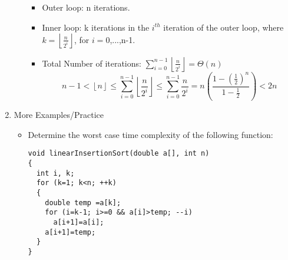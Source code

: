 \begin{enumerate}
\begin{itemize}
    \begin{itemize}
    \item Outer loop: n iterations.
    \item Inner loop: k iterations in the $i^{th}$ iteration of the outer loop, where $k=\left\lfloor\frac{n}{2^{i}}\right\rfloor$, for $i=0$,...,n-1.
    \item Total Number of iterations: $\displaystyle \sum\limits_{i=0}^{n-1}\left\lfloor\frac{n}{2^{i}}\right\rfloor =\Theta (n)$
    $$n-1 < \left\lfloor n\right\rfloor \leq \sum\limits_{i=0}^{n-1}\left\lfloor\frac{n}{2^{i}}\right\rfloor \leq \sum\limits_{i=0}^{n-1}\frac{n}{2^{i}} = n\left(\frac{1-\left(\frac{1}{2}\right)^{n}}{1-\frac{1}{2}}\right) < 2n$$
    \end{itemize}
  \end{itemize}
\item More Examples/Practice
  \begin{itemize}
  \item Determine the worst case time complexity of the following function:
\begin{lstlisting}
void linearInsertionSort(double a[], int n)
{
  int i, k;
  for (k=1; k<n; ++k)
  {
    double temp =a[k];
    for (i=k-1; i>=0 && a[i]>temp; --i)
      a[i+1]=a[i];
    a[i+1]=temp;
  }
}
\end{lstlisting}
  \end{itemize}

\end{enumerate}
